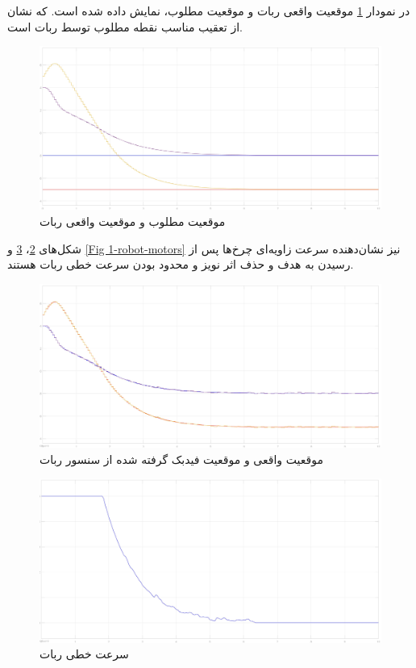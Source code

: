 در نمودار \ref{Fig 1-robot-pos} موقعیت واقعی ربات و موقعیت مطلوب، نمایش داده شده است. که نشان از تعقیب مناسب نقطه مطلوب توسط ربات است.
 \begin{figure}[!h] 
 	\centering
 	\includegraphics[scale=0.12]{Images/1-robot pos.jpg}
 	\caption{موقعیت مطلوب و موقعیت واقعی ربات} \label{Fig 1-robot-pos}
 \end{figure}
 
 شکل‌های \ref{Fig 1-robot-noise}، \ref{Fig 1-robot-speed} و \ref{Fig 1-robot-motors} نیز نشان‌دهنده سرعت زاویه‌ای چرخ‌ها پس از رسیدن به هدف و حذف اثر نویز و محدود بودن سرعت خطی ربات هستند.
 
 \begin{figure}[!h] 
 	\centering
 	\includegraphics[scale=0.12]{Images/1-robot noise.jpg}
 	\caption{موقعیت واقعی و موقعیت فیدبک گرفته شده از سنسور ربات} \label{Fig 1-robot-noise}
 \end{figure}
 
 \begin{figure}[!h] 
 	\centering
 	\includegraphics[scale=0.12]{Images/1-robot speed.jpg}
 	\caption{سرعت خطی ربات} \label{Fig 1-robot-speed}
 \end{figure}
 
